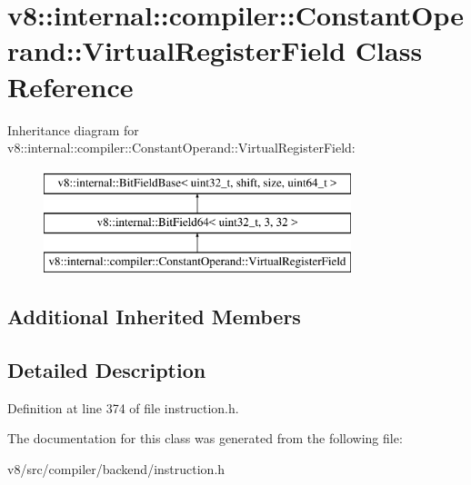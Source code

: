 \hypertarget{classv8_1_1internal_1_1compiler_1_1ConstantOperand_1_1VirtualRegisterField}{}\section{v8\+:\+:internal\+:\+:compiler\+:\+:Constant\+Operand\+:\+:Virtual\+Register\+Field Class Reference}
\label{classv8_1_1internal_1_1compiler_1_1ConstantOperand_1_1VirtualRegisterField}
Inheritance diagram for v8\+:\+:internal\+:\+:compiler\+:\+:Constant\+Operand\+:\+:Virtual\+Register\+Field\+:\begin{figure}[H]
\begin{center}
\leavevmode
\includegraphics[height=3.000000cm]{classv8_1_1internal_1_1compiler_1_1ConstantOperand_1_1VirtualRegisterField}
\end{center}
\end{figure}
\subsection*{Additional Inherited Members}


\subsection{Detailed Description}


Definition at line 374 of file instruction.\+h.



The documentation for this class was generated from the following file\+:\begin{DoxyCompactItemize}
\item 
v8/src/compiler/backend/instruction.\+h\end{DoxyCompactItemize}
